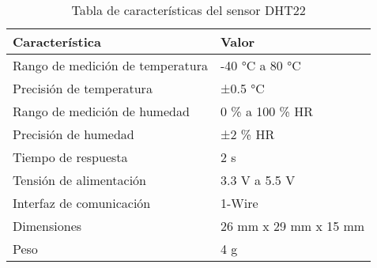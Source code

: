 \begin{table}[H]
\centering
\caption{Tabla de características del sensor DHT22}
\label{tab:dht22_caracteristicas}
\begin{tabular}{|l|l|}
\hline
\textbf{Característica}                              & \textbf{Valor}                       \\ \hline
Rango de medición de temperatura                     & -40 °C a 80 °C                       \\ \hline
Precisión de temperatura                             & ±0.5 °C                              \\ \hline
Rango de medición de humedad                         & 0 \% a 100 \% HR                     \\ \hline
Precisión de humedad                                 & ±2 \% HR                             \\ \hline
Tiempo de respuesta                                  & 2 s                                  \\ \hline
Tensión de alimentación                              & 3.3 V a 5.5 V                        \\ \hline
Interfaz de comunicación                             & 1-Wire                               \\ \hline
Dimensiones                                          & 26 mm x 29 mm x 15 mm                \\ \hline
Peso                                                 & 4 g                                  \\ \hline
\end{tabular}
\end{table}
